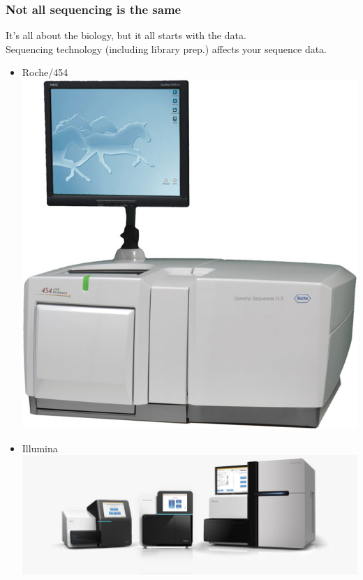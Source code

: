 \begin{frame}
  \frametitle{Not all sequencing is the same}
  It's all about the biology, but it all starts with the data.\\
  Sequencing technology (including library prep.) affects your sequence data.
  \begin{itemize}
    \item Roche/454 \includegraphics[height=0.15\textheight]{images/454_sequencer}
    \item Illumina \includegraphics[height=0.15\textheight]{images/miseq_nextseq_hiseq}

\end{itemize}
\end{frame}
